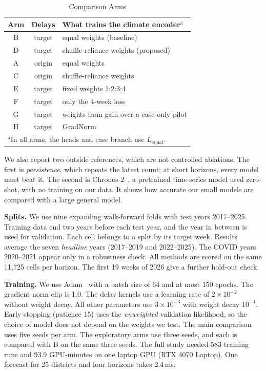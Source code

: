\documentclass[conference]{IEEEtran}
\begin{document}
\begin{table}[htbp]
\caption{Comparison Arms}
\begin{center}
\begin{tabular}{|c|c|p{3.9cm}|}
\hline
\textbf{Arm} & \textbf{Delays} & \textbf{What trains the climate encoder}$^{\mathrm{a}}$ \\
\hline
B & target & equal weights (baseline) \\
D & target & shuffle-reliance weights (proposed) \\
A & origin & equal weights \\
C & origin & shuffle-reliance weights \\
E & target & fixed weights 1:2:3:4 \\
F & target & only the 4-week loss \\
G & target & weights from gain over a case-only pilot \\
H & target & GradNorm~\cite{chen2018gradnorm} \\
\hline
\multicolumn{3}{l}{$^{\mathrm{a}}$In all arms, the heads and case branch use $L_{\mathrm{equal}}$.}
\end{tabular}
\label{tab:arms}
\end{center}
\end{table}

We also report two outside references, which are not controlled ablations. The first is \emph{persistence}, which repeats the latest count; at short horizons, every model must beat it. The second is Chronos-2~\cite{ansari2025chronos2}, a pretrained time-series model used zero-shot, with no training on our data. It shows how accurate our small models are compared with a large general model.

\textbf{Splits.} We use nine expanding walk-forward folds with test years 2017--2025. Training data end two years before each test year, and the year in between is used for validation. Each cell belongs to a split by its target week. Results average the seven \emph{headline} years (2017--2019 and 2022--2025). The COVID years 2020--2021 appear only in a robustness check. All methods are scored on the same 11,725 cells per horizon. The first 19 weeks of 2026 give a further hold-out check.

\textbf{Training.} We use Adam~\cite{kingma2015adam} with a batch size of 64 and at most 150 epochs. The gradient-norm clip is 1.0. The delay kernels use a learning rate of $2\times10^{-2}$ without weight decay. All other parameters use $3\times10^{-3}$ with weight decay $10^{-4}$. Early stopping (patience 15) uses the \emph{unweighted} validation likelihood, so the choice of model does not depend on the weights we test. The main comparison uses five seeds per arm. The exploratory arms use three seeds, and each is compared with B on the same three seeds. The full study needed 583 training runs and 93.9 GPU-minutes on one laptop GPU (RTX 4070 Laptop). One forecast for 25 districts and four horizons takes 2.4\,ms.
\end{document}
